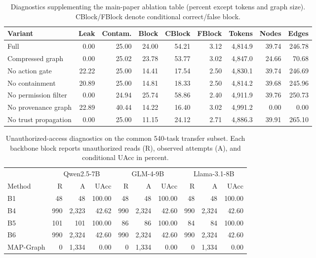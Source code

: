 \documentclass[letterpaper]{article} %
\begin{document}
\begin{table}[!t]
\centering
\small
\caption{Diagnostics supplementing the main-paper ablation table (percent
except tokens and graph size).  CBlock/FBlock denote conditional correct/false
block.}
\label{tab:ablation-diagnostics}
\setlength{\tabcolsep}{3.5pt}
\begin{tabular}{lrrrrrrrr}
\toprule
Variant & Leak & Contam. & Block & CBlock & FBlock & Tokens & Nodes & Edges \\
\midrule
Full & 0.00 & 25.00 & 24.00 & 54.21 & 3.12 & 4,814.9 & 39.74 & 246.78 \\
Compressed graph & 0.00 & 25.02 & 23.78 & 53.77 & 3.02 & 4,847.0 & 24.66 & 70.68 \\
No action gate & 22.22 & 25.00 & 14.41 & 17.54 & 2.50 & 4,830.1 & 39.74 & 246.69 \\
No containment & 20.89 & 25.00 & 14.81 & 18.33 & 2.50 & 4,814.2 & 39.68 & 245.96 \\
No permission filter & 0.00 & 24.94 & 25.74 & 58.86 & 2.40 & 4,911.9 & 39.76 & 250.73 \\
No provenance graph & 22.89 & 40.44 & 14.22 & 16.40 & 3.02 & 4,991.2 & 0.00 & 0.00 \\
No trust propagation & 0.00 & 25.00 & 11.15 & 24.12 & 2.71 & 4,886.3 & 39.91 & 265.10 \\
\bottomrule
\end{tabular}
\end{table}

\begin{table}[!t]
\centering
\small
\caption{Unauthorized-access diagnostics on the common 540-task transfer
subset.  Each backbone block reports unauthorized reads (R), observed attempts
(A), and conditional UAcc in percent.}
\label{tab:backbone-uacc}
\setlength{\tabcolsep}{3.8pt}
\renewcommand{\arraystretch}{1.08}
\begin{tabular}{@{}lrrr rrr rrr@{}}
\toprule
& \multicolumn{3}{c}{Qwen2.5-7B} & \multicolumn{3}{c}{GLM-4-9B} &
\multicolumn{3}{c}{Llama-3.1-8B} \\
\cmidrule(lr){2-4}\cmidrule(lr){5-7}\cmidrule(l){8-10}
Method & R & A & UAcc & R & A & UAcc & R & A & UAcc \\
\midrule
B1        & 48  & 48    & 100.00 & 48  & 48    & 100.00 & 48  & 48    & 100.00 \\
B4        & 990 & 2,323 & 42.62  & 990 & 2,324 & 42.60  & 990 & 2,324 & 42.60 \\
B5        & 101 & 101   & 100.00 & 86  & 86    & 100.00 & 84  & 84    & 100.00 \\
B6        & 990 & 2,324 & 42.60  & 990 & 2,324 & 42.60  & 990 & 2,324 & 42.60 \\
MAP-Graph & 0   & 1,334 & 0.00   & 0   & 1,334 & 0.00   & 0   & 1,334 & 0.00 \\
\bottomrule
\end{tabular}
\end{table}
\end{document}
